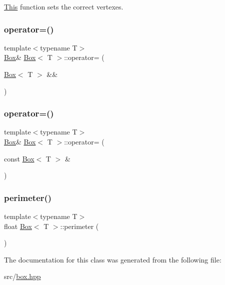 \mbox{\hyperlink{classThis}{This}} function sets the correct vertexes. 

\mbox{\label{classBox_a09995e3360b336b8a477d84804a5a70d}} 
\subsubsection{\texorpdfstring{operator=()}{operator=()}\hspace{0.1cm}{\footnotesize\ttfamily [1/2]}}
{\footnotesize\ttfamily template$<$typename T$>$ \\
\mbox{\hyperlink{classBox}{Box}}\& \mbox{\hyperlink{classBox}{Box}}$<$ T $>$\+::operator= (\begin{DoxyParamCaption}\item[{\mbox{\hyperlink{classBox}{Box}}$<$ T $>$ \&\&}]{ }\end{DoxyParamCaption})\hspace{0.3cm}{\ttfamily [default]}}

\mbox{\label{classBox_a6ea0d233bdcce789b46384d22601da8d}} 
\subsubsection{\texorpdfstring{operator=()}{operator=()}\hspace{0.1cm}{\footnotesize\ttfamily [2/2]}}
{\footnotesize\ttfamily template$<$typename T$>$ \\
\mbox{\hyperlink{classBox}{Box}}\& \mbox{\hyperlink{classBox}{Box}}$<$ T $>$\+::operator= (\begin{DoxyParamCaption}\item[{const \mbox{\hyperlink{classBox}{Box}}$<$ T $>$ \&}]{ }\end{DoxyParamCaption})\hspace{0.3cm}{\ttfamily [default]}}

\mbox{\label{classBox_ac64e9d619b0f3b991174a2ac49fef899}} 
\subsubsection{\texorpdfstring{perimeter()}{perimeter()}}
{\footnotesize\ttfamily template$<$typename T$>$ \\
float \mbox{\hyperlink{classBox}{Box}}$<$ T $>$\+::perimeter (\begin{DoxyParamCaption}{ }\end{DoxyParamCaption})}



The documentation for this class was generated from the following file\+:\begin{DoxyCompactItemize}
\item 
src/\mbox{\hyperlink{box_8hpp}{box.\+hpp}}\end{DoxyCompactItemize}
